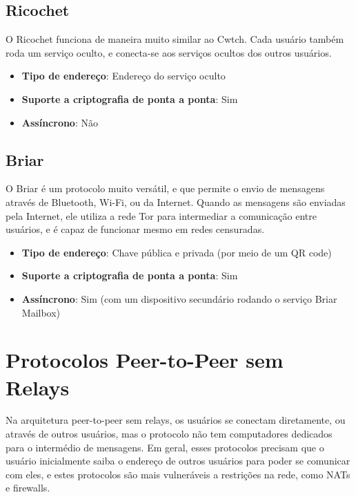 \subsection{Ricochet}

O Ricochet funciona de maneira muito similar ao Cwtch. Cada usuário também roda um serviço oculto, e conecta-se aos serviços ocultos dos outros usuários. \cite{ricochet}

\begin{itemize}
  \item \textbf{Tipo de endereço}: Endereço do serviço oculto
  \item \textbf{Suporte a criptografia de ponta a ponta}: Sim
  \item \textbf{Assíncrono}: Não
\end{itemize}

\subsection{Briar}

O Briar é um protocolo muito versátil, e que permite o envio de mensagens através de Bluetooth, Wi-Fi, ou da Internet. Quando as mensagens são enviadas pela Internet, ele utiliza a rede Tor para intermediar a comunicação entre usuários, e é capaz de funcionar mesmo em redes censuradas. \cite{briar}

\begin{itemize}
  \item \textbf{Tipo de endereço}: Chave pública e privada (por meio de um QR code)
  \item \textbf{Suporte a criptografia de ponta a ponta}: Sim
  \item \textbf{Assíncrono}: Sim (com um dispositivo secundário rodando o serviço Briar Mailbox)
\end{itemize}

\section{Protocolos Peer-to-Peer sem Relays}

Na arquitetura peer-to-peer sem relays, os usuários se conectam diretamente, ou através de outros usuários, mas o protocolo não tem computadores dedicados para o intermédio de mensagens. Em geral, esses protocolos precisam que o usuário inicialmente saiba o endereço de outros usuários para poder se comunicar com eles, e estes protocolos são mais vulneráveis a restrições na rede, como NATs e firewalls.

